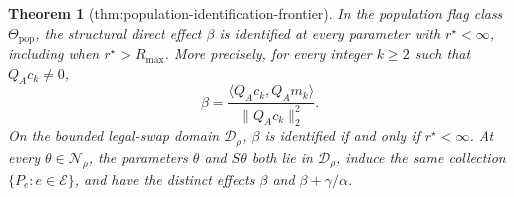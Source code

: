 \documentclass{article}
\newtheorem{theorem}{Theorem}
\begin{document}
\begin{theorem}[thm:population-identification-frontier]\label{thm:population-identification-frontier}
In the population flag class \(\Theta_{\mathrm{pop}}\), the structural direct effect \(\beta\) is identified at every parameter with \(r^\star<\infty\), including when \(r^\star>R_{\max}\).  More precisely, for every integer \(k\geq2\) such that \(Q_Ac_k\neq0\),
\[
 \beta=\frac{\langle Q_Ac_k,Q_Am_k\rangle}
              {\lVert Q_Ac_k\rVert_2^2}.                                  \tag{1}
\]
On the bounded legal-swap domain \(\mathcal D_\rho\), \(\beta\) is identified if and only if \(r^\star<\infty\).  At every \(\theta\in\mathcal N_\rho\), the parameters \(\theta\) and \(S\theta\) both lie in \(\mathcal D_\rho\), induce the same collection \(\{P_e:e\in\mathcal E\}\), and have the distinct effects \(\beta\) and \(\beta+\gamma/\alpha\).
\end{theorem}
\end{document}
